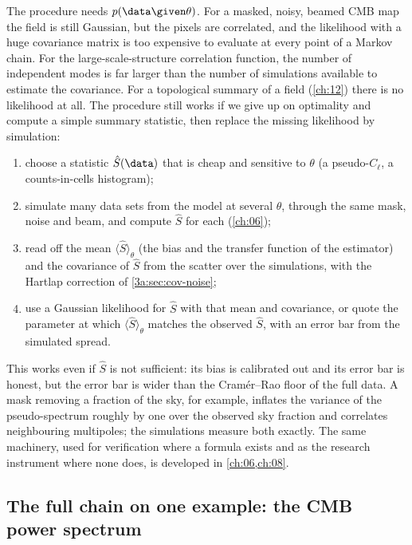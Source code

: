 The procedure needs $p(\data\given\theta)$. For a masked, noisy, beamed
CMB map the field is still Gaussian, but the pixels are correlated, and the
likelihood with a huge covariance matrix is too expensive to evaluate at every point
of a Markov chain. For the large-scale-structure correlation function, the
number of independent modes is far larger than the number of simulations
available to estimate the covariance. For a topological summary of a field
(\cref{ch:12}) there is no likelihood at all. The procedure still works if
we give up on optimality and compute a simple summary statistic, then
replace the missing likelihood by simulation:
\begin{enumerate}
  \item choose a statistic $\hat S(\data)$ that is cheap and sensitive to
        $\theta$ (a pseudo-$C_\ell$, a counts-in-cells histogram);
  \item simulate many data sets from the model at several $\theta$, through
        the same mask, noise and beam, and compute $\hat S$ for each
        (\cref{ch:06});
  \item read off the mean $\langle\hat S\rangle_\theta$ (the bias and the
        transfer function of the estimator) and the covariance of $\hat S$ from the
        scatter over the simulations, with the Hartlap correction of
        \cref{3a:sec:cov-noise};
  \item use a Gaussian likelihood for $\hat S$ with that mean and covariance,
        or quote the parameter at which $\langle\hat S\rangle_\theta$ matches
        the observed $\hat S$, with an error bar from the simulated spread.
\end{enumerate}
This works even if $\hat S$ is not sufficient: its bias is calibrated out and
its error bar is honest, but the error bar is wider than the Cram\'er--Rao
floor of the full data. A mask removing a fraction of the sky, for example,
inflates the variance of the pseudo-spectrum roughly by one over the
observed sky fraction and correlates neighbouring multipoles; the simulations
measure both exactly. The same machinery, used for verification where a
formula exists and as the research instrument where none does, is
developed in \cref{ch:06,ch:08}.

\subsection{The full chain on one example: the CMB power spectrum}
\label{3b:sec:recipe-cmb}

